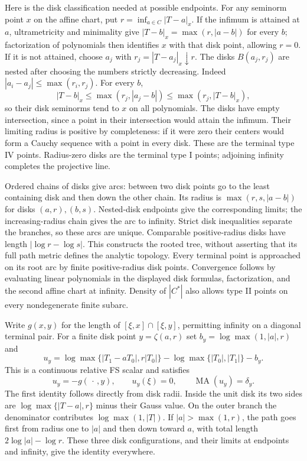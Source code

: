 \documentclass[11pt]{article}
\newcommand{\MA}{\operatorname{MA}}
\begin{document}
Here is the disk classification needed at possible endpoints.
For any seminorm point $x$ on the affine chart, put
$r=\inf_{a\in C}|T-a|_x$. If the infimum is attained at $a$,
ultrametricity and minimality give
$|T-b|_x=\max(r,|a-b|)$ for every $b$; factorization of polynomials
then identifies $x$ with that disk point, allowing $r=0$.
If it is not attained, choose $a_j$ with
$r_j=|T-a_j|_x\downarrow r$. The disks $B(a_j,r_j)$ are nested
after choosing the numbers strictly decreasing. Indeed
$|a_i-a_j|\leq\max(r_i,r_j)$. For every $b$,
\[
 |T-b|_x\leq\max(r_j,|a_j-b|)
                \leq\max(r_j,|T-b|_x),
\]
so their disk seminorms tend to $x$ on all polynomials.
The disks have empty intersection, since a point in their
intersection would attain the infimum. Their limiting radius is
positive by completeness: if it were zero their centers would
form a Cauchy sequence with a point in every disk.
These are the terminal type IV points. Radius-zero disks are
the terminal type I points; adjoining infinity completes the
projective line.

Ordered chains of disks give arcs: between two disk points go to
the least containing disk and then down the other chain. Its radius
is $\max(r,s,|a-b|)$ for disks $(a,r),(b,s)$. Nested-disk endpoints
give the corresponding limits; the increasing-radius chain gives
the arc to infinity. Strict disk inequalities separate the branches,
so these arcs are unique. Comparable positive-radius disks have
length $|\log r-\log s|$. This constructs the rooted tree, without
asserting that its full path metric defines the analytic topology.
Every terminal point is approached on its root arc by finite
positive-radius disk points. Convergence follows by evaluating
linear polynomials in the displayed disk formulas, factorization,
and the second affine chart at infinity. Density of $|C^*|$ also
allows type II points on every nondegenerate finite subarc.

Write $g(x,y)$ for the length of
$[\xi,x]\cap[\xi,y]$, permitting infinity on a diagonal terminal
pair. For a finite disk point $y=\zeta(a,r)$ set
$b_y=\log\max(1,|a|,r)$ and
\begin{equation}\label{eq:kernel}
 u_y=\log\max\{|T_1-aT_0|,r|T_0|\}
              -\log\max\{|T_0|,|T_1|\}-b_y.
\end{equation}
This is a continuous relative FS scalar and satisfies
\begin{equation}\label{eq:atom}
                 u_y=-g(\,\cdot\,,y),\qquad
                 u_y(\xi)=0,\qquad \MA(u_y)=\delta_y.
\end{equation}
The first identity follows directly from disk radii. Inside the
unit disk its two sides are
$\log\max\{|T-a|,r\}$ minus their Gauss value. On the outer
branch the denominator contributes $\log\max(1,|T|)$.
If $|a|>\max(1,r)$, the path goes first from radius one to
$|a|$ and then down toward $a$, with total length
$2\log|a|-\log r$. These three disk configurations, and their
limits at endpoints and infinity, give the identity everywhere.
\end{document}
